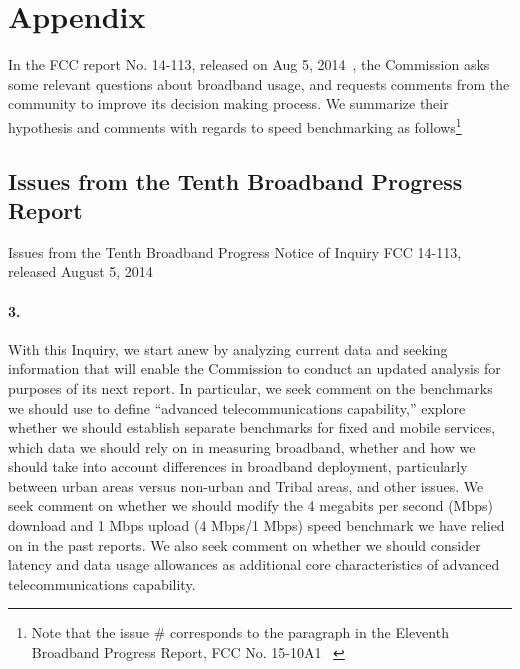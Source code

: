 \section*{Appendix}
\label{sec:appendix}

In the FCC report No. 14-113, released on Aug 5, 2014~\cite{fcc2014progress-report},
the Commission asks some relevant questions about broadband usage, and requests comments
from the community to improve its decision making process. We summarize their hypothesis
and comments with regards to speed benchmarking as follows\footnote{Note that the issue
\# corresponds to the paragraph in the Eleventh Broadband Progress Report, FCC No. 
15-10A1 ~\cite{fcc2015progress-report}\label{foot:fcc-issue-numbers}}


\subsection{Issues from the Tenth Broadband Progress Report}
\label{subsec:fcc2014}

Issues from the Tenth Broadband Progress Notice of Inquiry FCC 14-113, released August 5, 2014~\cite{fcc2014progress-report}

\paragraph{3.} With this Inquiry, we start anew by analyzing current data and seeking information that will enable the Commission to conduct an updated analysis for purposes of its next report. In particular, we seek comment on the benchmarks we should use to define ``advanced telecommunications capability,'' explore whether we should establish separate benchmarks for fixed and mobile services, which data we should rely on in measuring broadband, whether and how we should take into account differences in broadband deployment, particularly between urban areas versus non-urban and Tribal areas, and other issues. We seek comment on whether we should modify the 4 megabits per second (Mbps) download and 1 Mbps upload (4 Mbps/1 Mbps) speed benchmark we have relied on in the past reports. We also seek comment on whether we should consider latency and data usage allowances as additional core
characteristics of advanced telecommunications capability.

